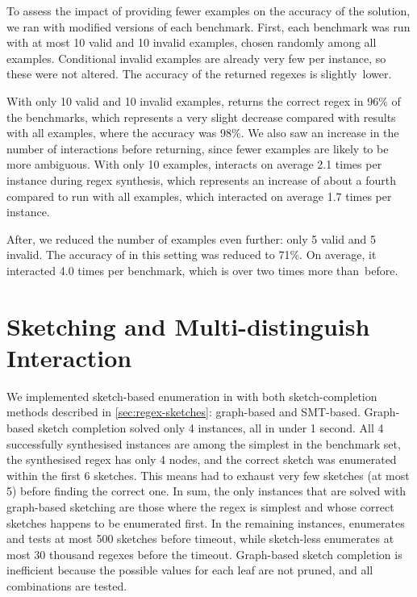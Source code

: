 To assess the impact of providing fewer examples on the accuracy of the solution, we ran \Forest{} with modified versions of each benchmark.
First, each benchmark was run with at most 10 valid and 10 invalid examples, chosen randomly among all examples. Conditional invalid examples are already very few per instance, so these were not altered. The accuracy of the returned regexes is slightly~lower.

With only 10 valid and 10 invalid examples, \Forest{} returns the correct regex in 96\% of the benchmarks, which represents a very slight decrease compared with results with all examples, where the accuracy was 98\%.
We also saw an increase in the number of interactions before returning, since fewer examples are likely to be more ambiguous. With only 10 examples, \Forest{} interacts on average 2.1 times per instance during regex synthesis, which represents an increase of about a fourth compared to \Forest run with all examples, which interacted on average 1.7 times per instance.

After, we reduced the number of examples even further: only 5 valid and 5 invalid. The accuracy of \Forest{} in this setting was reduced to 71\%. On average, it interacted 4.0 times per benchmark, which is over two times more than~before.


\section{Sketching and Multi-distinguish Interaction}
\label{sec:res-sketching-interaction}

We implemented sketch-based enumeration in \Forest with both sketch-completion methods described in \autoref{sec:regex-sketches}: graph-based and \ac{SMT}-based.
%
Graph-based sketch completion solved only 4 instances, all in under 1 second. All 4 successfully synthesised instances are among the simplest in the benchmark set, the synthesised regex has only 4 nodes, and the correct sketch was enumerated within the first 6 sketches. This means \Forest had to exhaust very few sketches (at most 5) before finding the correct one. In sum, the only instances that are solved with graph-based sketching are those where the regex is simplest and whose correct sketches happens to be enumerated first. In the remaining instances, \Forest enumerates and tests at most 500 sketches before timeout, while sketch-less \Forest enumerates at most 30 thousand regexes before the timeout. Graph-based sketch completion is inefficient because the possible values for each leaf are not pruned, and all combinations are tested.

